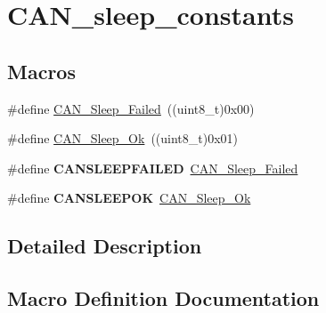 \hypertarget{group___c_a_n__sleep__constants}{}\section{C\+A\+N\+\_\+sleep\+\_\+constants}
\label{group___c_a_n__sleep__constants}
\subsection*{Macros}
\begin{DoxyCompactItemize}
\item 
\#define \hyperlink{group___c_a_n__sleep__constants_ga169500ab7169c4e9c7e9e4ea34b3e070}{C\+A\+N\+\_\+\+Sleep\+\_\+\+Failed}~((uint8\+\_\+t)0x00)
\item 
\#define \hyperlink{group___c_a_n__sleep__constants_gaf5c4e9d32d4faff9d0bf61e153ed7998}{C\+A\+N\+\_\+\+Sleep\+\_\+\+Ok}~((uint8\+\_\+t)0x01)
\item 
\hypertarget{group___c_a_n__sleep__constants_ga4d5e8e0c57febb024b30e5f24866a117}{}\#define {\bfseries C\+A\+N\+S\+L\+E\+E\+P\+F\+A\+I\+L\+E\+D}~\hyperlink{group___c_a_n__sleep__constants_ga169500ab7169c4e9c7e9e4ea34b3e070}{C\+A\+N\+\_\+\+Sleep\+\_\+\+Failed}\label{group___c_a_n__sleep__constants_ga4d5e8e0c57febb024b30e5f24866a117}

\item 
\hypertarget{group___c_a_n__sleep__constants_ga2f8d34f8f60a6c84d8e436d4d37708ab}{}\#define {\bfseries C\+A\+N\+S\+L\+E\+E\+P\+O\+K}~\hyperlink{group___c_a_n__sleep__constants_gaf5c4e9d32d4faff9d0bf61e153ed7998}{C\+A\+N\+\_\+\+Sleep\+\_\+\+Ok}\label{group___c_a_n__sleep__constants_ga2f8d34f8f60a6c84d8e436d4d37708ab}

\end{DoxyCompactItemize}


\subsection{Detailed Description}


\subsection{Macro Definition Documentation}
\hypertarget{group___c_a_n__sleep__constants_ga169500ab7169c4e9c7e9e4ea34b3e070}{}
